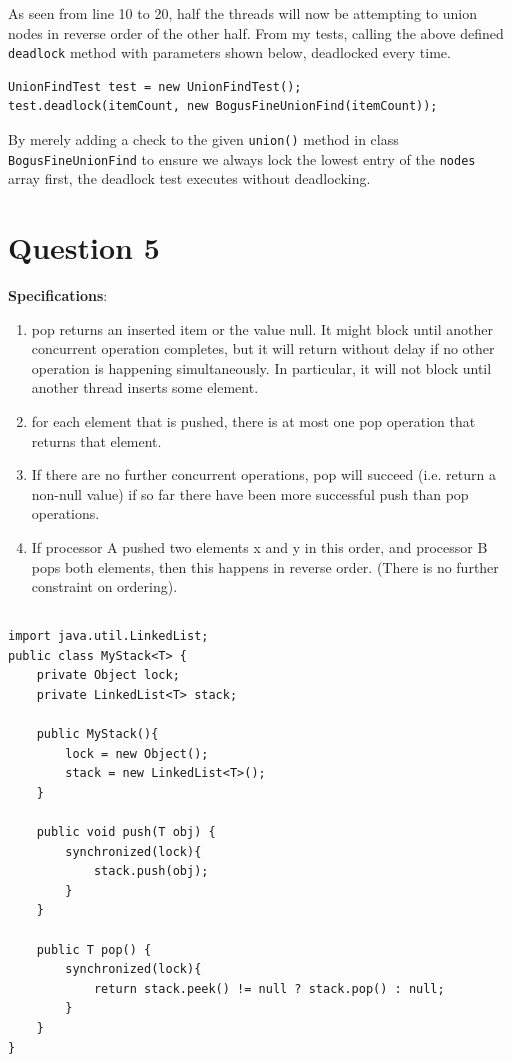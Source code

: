 \documentclass[a5paper]{article}
\begin{document}
As seen from line 10 to 20, half the threads will now be attempting to union nodes in reverse order of the other half.
From my tests, calling the above defined \texttt{deadlock} method with parameters shown below, deadlocked every time.

\begin{lstlisting}
UnionFindTest test = new UnionFindTest();
test.deadlock(itemCount, new BogusFineUnionFind(itemCount));
\end{lstlisting}

By merely adding a check to the given \texttt{union()} method in class \texttt{BogusFineUnionFind} to ensure we always lock the lowest entry of the \texttt{nodes} array first, the deadlock test
executes without deadlocking.

\section{Question 5}
\textbf{Specifications}:
\begin{enumerate}
\item pop returns an inserted item or the value null. It might block until another concurrent operation completes,
but it will return without delay if no other operation is happening simultaneously. In particular, it will not
block until another thread inserts some element.
\item for each element that is pushed, there is at most one pop operation that returns that element.
\item If there are no further concurrent operations, pop will succeed (i.e. return a non-null value) if so far there
have been more successful push than pop operations.
\item If processor A pushed two elements x and y in this order, and processor B pops both elements, then this
happens in reverse order. (There is no further constraint on ordering).
\end{enumerate}

\subsection{}\label{sec:mystacksimple}
\begin{lstlisting}
import java.util.LinkedList;
public class MyStack<T> {
    private Object lock;
    private LinkedList<T> stack;

    public MyStack(){
        lock = new Object();
        stack = new LinkedList<T>();
    }

    public void push(T obj) {
        synchronized(lock){
            stack.push(obj);
        }
    }

    public T pop() {
        synchronized(lock){
            return stack.peek() != null ? stack.pop() : null;
        }
    }
}
\end{lstlisting}
\end{document}
